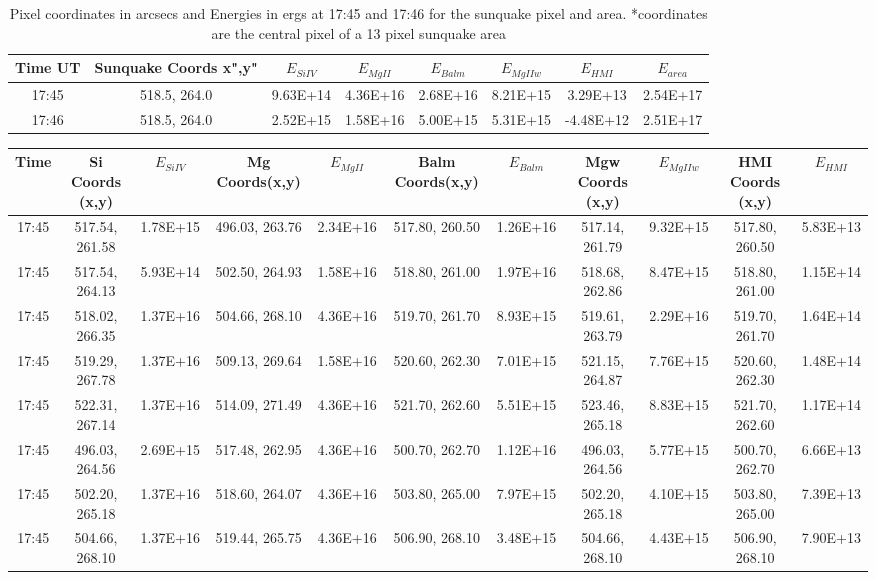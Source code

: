 \begin{table}
\centering
\begin{tabular}{|c|c|c|c|c|c|c|c|}
Time UT & Sunquake Coords x",y"  & $E_{Si IV}$ & $E_{Mg II}$ & $E_{Balm}$ & $E_{Mg II w}$ & $E_{HMI}$ & $E_{area}$\\
\hline
17:45 & 518.5, 264.0 & 9.63E+14 & 4.36E+16 & 2.68E+16 & 8.21E+15 & 3.29E+13 & 2.54E+17\\
17:46 & 518.5, 264.0 & 2.52E+15 & 1.58E+16 & 5.00E+15 & 5.31E+15 & -4.48E+12 & 2.51E+17\\
\end{tabular}
\caption{Pixel coordinates in arcsecs and Energies in ergs at 17:45 and 17:46 for the sunquake pixel and area. *coordinates are the central pixel of a 13 pixel sunquake area}\label{qkenergytab}
\end{table}
\begin{sidewaystable}[h]
\tiny
\centering
\begin{tabular}{|c|c|c|c|c|c|c|c|c|c|c|}
Time & Si Coords (x,y) & $E_{Si IV}$ & Mg Coords(x,y) & $E_{Mg II}$ & Balm Coords(x,y) & $E_{Balm}$ & Mgw Coords (x,y) & $E_{Mg II w}$ & HMI Coords (x,y) & $E_{HMI}$\\
\hline
17:45 & 517.54, 261.58 & 1.78E+15 & 496.03, 263.76 & 2.34E+16 & 517.80, 260.50 & 1.26E+16 & 517.14, 261.79 & 9.32E+15 & 517.80, 260.50 & 5.83E+13\\
17:45 & 517.54, 264.13 & 5.93E+14 & 502.50, 264.93 & 1.58E+16 & 518.80, 261.00 & 1.97E+16 & 518.68, 262.86 & 8.47E+15 & 518.80, 261.00 & 1.15E+14\\
17:45 & 518.02, 266.35 & 1.37E+16 & 504.66, 268.10 & 4.36E+16 & 519.70, 261.70 & 8.93E+15 & 519.61, 263.79 & 2.29E+16 & 519.70, 261.70 & 1.64E+14\\
17:45 & 519.29, 267.78 & 1.37E+16 & 509.13, 269.64 & 1.58E+16 & 520.60, 262.30 & 7.01E+15 & 521.15, 264.87 & 7.76E+15 & 520.60, 262.30 & 1.48E+14\\
17:45 & 522.31, 267.14 & 1.37E+16 & 514.09, 271.49 & 4.36E+16 & 521.70, 262.60 & 5.51E+15 & 523.46, 265.18 & 8.83E+15 & 521.70, 262.60 & 1.17E+14\\
17:45 & 496.03, 264.56 & 2.69E+15 & 517.48, 262.95 & 4.36E+16 & 500.70, 262.70 & 1.12E+16 & 496.03, 264.56 & 5.77E+15 & 500.70, 262.70 & 6.66E+13\\
17:45 & 502.20, 265.18 & 1.37E+16 & 518.60, 264.07 & 4.36E+16 & 503.80, 265.00 & 7.97E+15 & 502.20, 265.18 & 4.10E+15 & 503.80, 265.00 & 7.39E+13\\
17:45 & 504.66, 268.10 & 1.37E+16 & 519.44, 265.75 & 4.36E+16 & 506.90, 268.10 & 3.48E+15 & 504.66, 268.10 & 4.43E+15 & 506.90, 268.10 & 7.90E+13\\

\end{tabular}
\end{sidewaystable}

